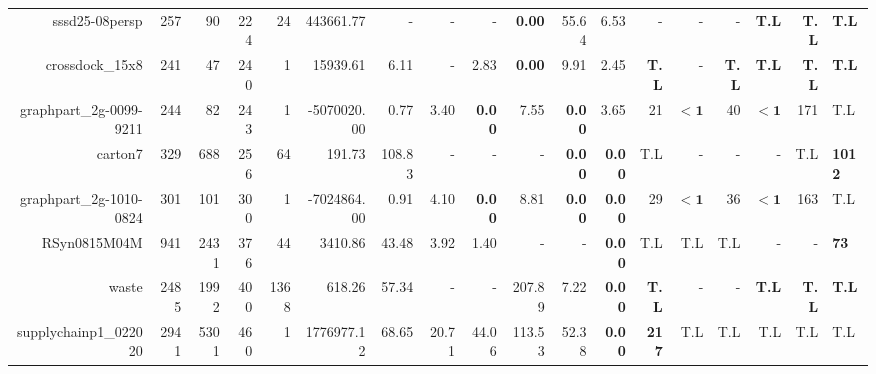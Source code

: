 \begin{table*}[t]
\begin{tabular}{|r|r|r|r|r||r||r|r|r|r|r||r|r|r|r|r|r|}
                    sssd25-08persp &          257 &            90 &          224 &            24 &           443661.77 &              - &              - &              - &  \textbf{0.00} &          55.64 &           6.53 &                  - &                  - &                  - &       \textbf{T.L} & \textbf{T.L} & \textbf{T.L} \\ 
                   crossdock\_15x8 &          241 &            47 &          240 &             1 &            15939.61 &           6.11 &              - &           2.83 &  \textbf{0.00} &           9.91 &           2.45 &       \textbf{T.L} &                  - &       \textbf{T.L} &       \textbf{T.L} & \textbf{T.L} & \textbf{T.L} \\ 
           graphpart\_2g-0099-9211 &          244 &            82 &          243 &             1 &         -5070020.00 &           0.77 &           3.40 &  \textbf{0.00} &           7.55 &  \textbf{0.00} &           3.65 &                 21 &         $\bm{< 1}$ &                 40 &         $\bm{< 1}$ &          171 &          T.L \\ 
                           carton7 &          329 &           688 &          256 &            64 &              191.73 &         108.83 &              - &              - &              - &  \textbf{0.00} &  \textbf{0.00} &                T.L &                  - &                  - &                  - &          T.L &\textbf{1012} \\ 
           graphpart\_2g-1010-0824 &          301 &           101 &          300 &             1 &         -7024864.00 &           0.91 &           4.10 &  \textbf{0.00} &           8.81 &  \textbf{0.00} &  \textbf{0.00} &                 29 &         $\bm{< 1}$ &                 36 &         $\bm{< 1}$ &          163 &          T.L \\ 
                      RSyn0815M04M &          941 &          2431 &          376 &            44 &             3410.86 &          43.48 &           3.92 &           1.40 &              - &              - &  \textbf{0.00} &                T.L &                T.L &                T.L &                  - &            - &  \textbf{73} \\ 
                             waste &         2485 &          1992 &          400 &          1368 &              618.26 &          57.34 &              - &              - &         207.89 &           7.22 &  \textbf{0.00} &       \textbf{T.L} &                  - &                  - &       \textbf{T.L} & \textbf{T.L} & \textbf{T.L} \\ 
             supplychainp1\_022020 &         2941 &          5301 &          460 &             1 &          1776977.12 &          68.65 &          20.71 &          44.06 &         113.53 &          52.38 &  \textbf{0.00} &       \textbf{217} &                T.L &                T.L &                T.L &          T.L &          T.L \\ 
\hline 
\end{tabular}\\ 
\label{table:results} 
\end{table*} 
 
